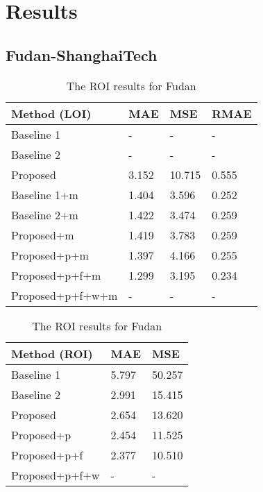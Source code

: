\chapter{Results}

\section{Fudan-ShanghaiTech}

\begin{table}[!htb]
	\begin{minipage}{.5\linewidth}
      \centering
		\begin{tabular}{llll}
		\hline
		Method (LOI)                               & MAE & MSE & RMAE \\ \hline
		\multicolumn{1}{l|}{Baseline 1}          & - & - & - \\
		\multicolumn{1}{l|}{Baseline 2}          & - & - & - \\
		\multicolumn{1}{l|}{Proposed}        	 & 3.152 & 10.715 & 0.555 \\
		\multicolumn{1}{l|}{Baseline 1+m}        & 1.404 & 3.596 & 0.252 \\
		\multicolumn{1}{l|}{Baseline 2+m}        & 1.422 & 3.474 & 0.259 \\
		\multicolumn{1}{l|}{Proposed+m}        	 & 1.419 & 3.783 & 0.259 \\
		\multicolumn{1}{l|}{Proposed+p+m}        & 1.397 & 4.166 & 0.255 \\
		\multicolumn{1}{l|}{Proposed+p+f+m}        & 1.299 & 3.195 & 0.234 \\
		\multicolumn{1}{l|}{Proposed+p+f+w+m}        & - & - & - \\ \hline
		\end{tabular}
		\caption{\label{tab:loi_fudan}The LOI results for Fudan}
	\end{minipage}
	\begin{minipage}{.5\linewidth}
      \centering
		\begin{tabular}{lll}
		\hline
		Method (ROI)                               & MAE & MSE \\ \hline
		\multicolumn{1}{l|}{Baseline 1}          & 5.797 & 50.257 \\
		\multicolumn{1}{l|}{Baseline 2}          & 2.991 & 15.415 \\
		\multicolumn{1}{l|}{Proposed}        	 & 2.654 & 13.620 \\
		\multicolumn{1}{l|}{Proposed+p}        	 & 2.454 & 11.525 \\
		\multicolumn{1}{l|}{Proposed+p+f} 		 & 2.377 & 10.510 \\
		\multicolumn{1}{l|}{Proposed+p+f+w}  	 & - & - \\ \hline
		\end{tabular}
		\caption{\label{tab:roi_fudan}The ROI results for Fudan}
	\end{minipage}
\end{table}

